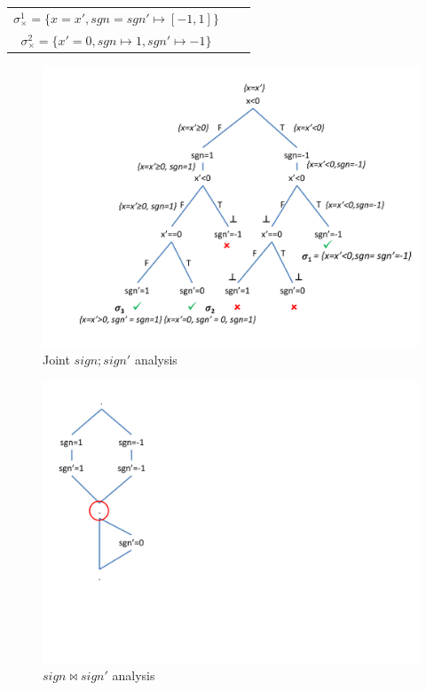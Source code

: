 
\vspace{0.1in}
\begin{tabular}{ccc}
\hspace{1cm} $\sigma_{\times}^1 = \{x = x', sgn = sgn' \mapsto [-1,1]\}$
\\
\hspace{1cm} $\sigma_{\times}^2 = \{x' = 0, sgn \mapsto 1, sgn' \mapsto -1\}$
\\
\end{tabular}
\vspace{0.1in}

\begin{figure}
\centering
\includegraphics[scale=0.38,clip=true,trim = 75pt 25pt 5pt 20pt]{figures/sign-graph-joint}
\caption{Joint $sign;sign'$ analysis}
\end{figure}



\begin{figure}
\centering
\includegraphics[scale=0.42,clip=true,trim = 0pt 150pt 450pt 150pt]{figures/sign-graph-correlated}
\caption{$sign \bowtie sign'$ analysis}
\end{figure}

